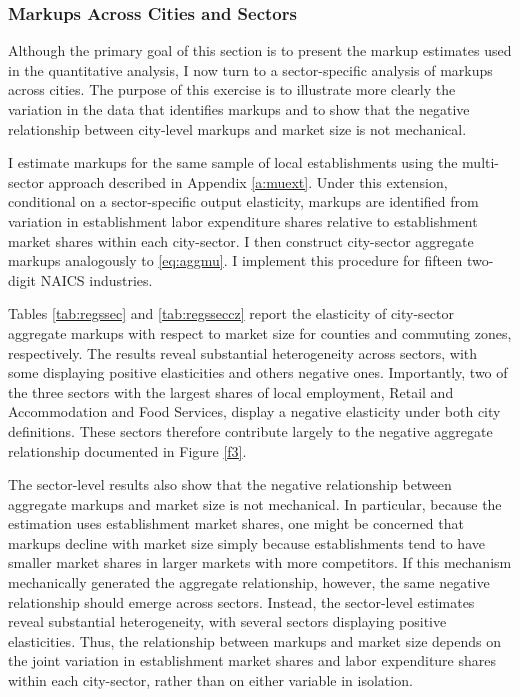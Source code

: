 \subsubsection{Markups Across Cities and Sectors}
Although the primary goal of this section is to present the markup estimates used in the quantitative analysis, I now turn to a sector-specific analysis of markups across cities. The purpose of this exercise is to illustrate more clearly the variation in the data that identifies markups and to show that the negative relationship between city-level markups and market size is not mechanical.

I estimate markups for the same sample of local establishments using the multi-sector approach described in Appendix \ref{a:muext}. Under this extension, conditional on a sector-specific output elasticity, markups are identified from variation in establishment labor expenditure shares relative to establishment market shares within each city-sector. I then construct city-sector aggregate markups analogously to \eqref{eq:aggmu}. I implement this procedure for fifteen two-digit NAICS industries.

Tables \ref{tab:regssec} and \ref{tab:regsseccz} report the elasticity of city-sector aggregate markups with respect to market size for counties and commuting zones, respectively. The results reveal substantial heterogeneity across sectors, with some displaying positive elasticities and others negative ones. Importantly, two of the three sectors with the largest shares of local employment, Retail and Accommodation and Food Services, display a negative elasticity under both city definitions. These sectors therefore contribute largely to the negative aggregate relationship documented in Figure \ref{f3}.

The sector-level results also show that the negative relationship between aggregate markups and market size is not mechanical. In particular, because the estimation uses establishment market shares, one might be concerned that markups decline with market size simply because establishments tend to have smaller market shares in larger markets with more competitors. If this mechanism mechanically generated the aggregate relationship, however, the same negative relationship should emerge across sectors. Instead, the sector-level estimates reveal substantial heterogeneity, with several sectors displaying positive elasticities. Thus, the relationship between markups and market size depends on the joint variation in establishment market shares and labor expenditure shares within each city-sector, rather than on either variable in isolation.

